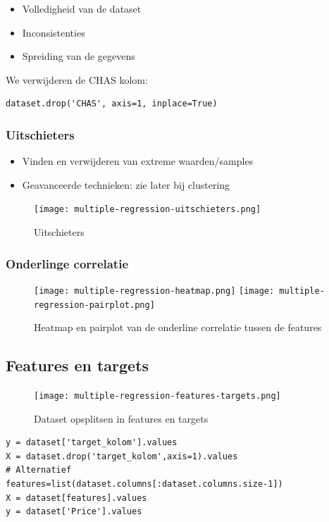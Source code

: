 \documentclass{article}
\begin{document}
\begin{itemize}
    \item Volledigheid van de dataset
    \item Inconsistenties
    \item Spreiding van de gegevens
\end{itemize}

We verwijderen de CHAS kolom:

\begin{verbatim}
dataset.drop('CHAS', axis=1, inplace=True)
\end{verbatim}


\subsubsection{Uitschieters}

\begin{itemize}
    \item Vinden en verwijderen van extreme waarden/samples
    \item Geavanceerde technieken: zie later bij clustering
\end{itemize}

\begin{figure}[H]
    \centering
    \texttt{[image: multiple-regression-uitschieters.png]}
    \caption{Uitschieters}
\end{figure}


\subsubsection{Onderlinge correlatie}

\begin{figure}[H]
    \centering
    \texttt{[image: multiple-regression-heatmap.png]}
    \texttt{[image: multiple-regression-pairplot.png]}
    \caption{Heatmap en pairplot van de onderline correlatie tussen de features}
\end{figure}

\subsection{Features en targets}

\begin{figure}[H]
    \centering
    \texttt{[image: multiple-regression-features-targets.png]}
    \caption{Dataset opsplitsen in features en targets}
\end{figure}

\begin{verbatim}
y = dataset['target_kolom'].values
X = dataset.drop('target_kolom',axis=1).values
# Alternatief
features=list(dataset.columns[:dataset.columns.size-1])
X = dataset[features].values
y = dataset['Price'].values
\end{verbatim}
\end{document}
